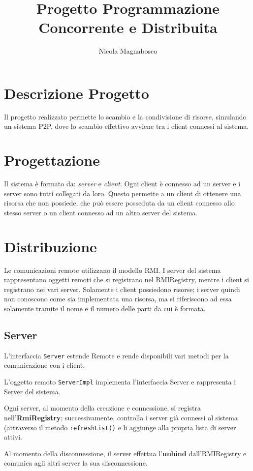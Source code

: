 \documentclass[10pt]{article}
\title{Progetto Programmazione Concorrente e Distribuita}
\author{Nicola Magnabosco}
\begin{document}
\maketitle
\section{Descrizione Progetto}
Il progetto realizzato permette lo scambio e la condivisione di risorse, simulando un sistema P2P, dove lo scambio effettivo avviene tra i client connessi al sistema.
\section{Progettazione}
Il sistema è formato da: \textit{server} e \textit{client}.
Ogni client è connesso ad un server e i server sono tutti collegati da loro. Questo permette a un client di ottenere una risorsa che non possiede, che può essere posseduta da un client connesso allo stesso server o un client connesso ad un altro server del sistema.
\section{Distribuzione}
Le comunicazioni remote utilizzano il modello RMI. I server del sistema rappresentano oggetti remoti che si registrano nel RMIRegistry, mentre i client si registrano nei vari server.
Solamente i client possiedono risorse; i server quindi non conoscono come sia implementata una risorsa, ma si riferiscono ad essa solamente tramite il nome e il numero delle parti da cui è formata.

\subsection{Server}
L'interfaccia {\verb!Server!} estende Remote e rende disponibili vari metodi per la comunicazione con i client.

L'oggetto remoto {\verb!ServerImpl!} implementa l'interfaccia Server e rappresenta i Server del sistema.

Ogni server, al momento della creazione e connessione, si registra nell'\textbf{RmiRegistry}; successivamente, controlla i server già connessi al sistema (attraverso il metodo {\verb!refreshList()!} e li aggiunge alla propria lista di server attivi.

Al momento della disconnessione, il server effettua l'\textbf{unbind} dall'RMIRegistry e comunica agli altri server la sua disconnessione.
\end{document}
